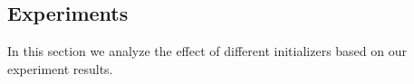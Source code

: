 \subsection{Experiments}

In this section we analyze the effect of different initializers based on our experiment results.
